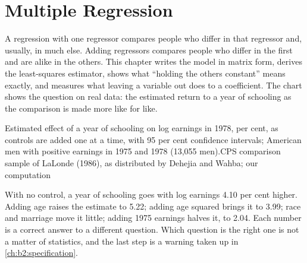 \chapter{Multiple Regression}\label{ch:b2:multiple-regression}

A regression with one regressor compares people who differ in that regressor and, usually, in much else. Adding
regressors compares people who differ in the first and are alike in the others. This chapter writes the model in matrix
form, derives the least-squares estimator, shows what ``holding the others constant'' means exactly, and measures what
leaving a variable out does to a coefficient. The chart shows the question on real data: the estimated return to a year
of schooling as the comparison is made more like for like.

\begin{openingchart}{Estimated effect of a year of schooling on log earnings in 1978, per cent, as controls are added one
  at a time, with 95 per cent confidence intervals; American men with positive earnings in 1975 and 1978 (13,055 men).}{CPS
  comparison sample of LaLonde (1986), as distributed by Dehejia and Wahba; our computation}
\end{openingchart}

With no control, a year of schooling goes with log earnings 4.10 per cent higher. Adding age raises the estimate to 5.22;
adding age squared brings it to 3.99; race and marriage move it little; adding 1975 earnings halves it, to 2.04. Each
number is a correct answer to a different question. Which question is the right one is not a matter of statistics, and the
last step is a warning taken up in \cref{ch:b2:specification}.

